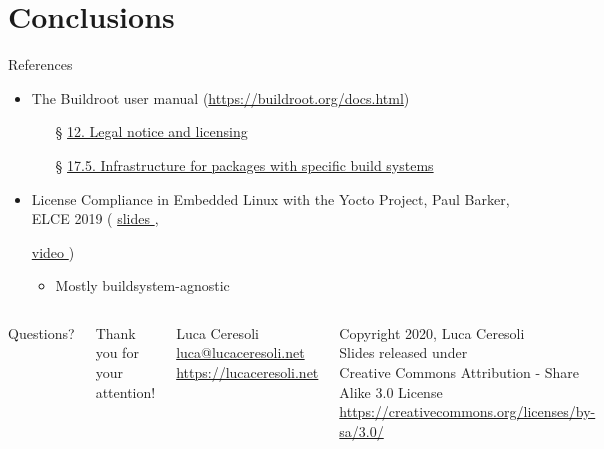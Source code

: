 \documentclass[xetex,table,table]{beamer}
\newcommand{\myhref}[2]{
  \href{#1}{#2 {\tiny\faExternalLink{}}}
}
\begin{document}
\section{Conclusions}

\begin{frame}{References}
  \begin{itemize}
  \item The Buildroot user manual ({\small\url{https://buildroot.org/docs.html}})
    \begin{itemize}
    \item[\S] \myhref{https://buildroot.org/downloads/manual/manual.html\#legal-info}
                     {12. Legal notice and licensing}
    \item[\S] \myhref{https://buildroot.org/downloads/manual/manual.html\#_infrastructure_for_packages_with_specific_build_systems}
                     {17.5. Infrastructure for packages with specific build systems}
    \end{itemize}
  \item License Compliance in Embedded Linux with the Yocto Project, Paul
    Barker, ELCE 2019
    (\myhref{https://elinux.org/images/2/20/License_Compliance_in_Embedded_Linux_with_the_Yocto_Project.pdf}{slides},
    \myhref{https://youtu.be/9wRn-9KhiEI?list=PLbzoR-pLrL6pamOj4UifcMJf560Ph6mJp}{video})
    \begin{itemize}
    \item Mostly buildsystem-agnostic
    \end{itemize}
  \end{itemize}
\end{frame}

\begin{frame}
  \begin{columns}
    \center

    {\Huge Questions?}

    \center

    {\Large Thank you for your attention!}

    \vspace{0.15\textheight}

    {\Large Luca Ceresoli}\\
    \href{mailto:luca@lucaceresoli.net}{luca@lucaceresoli.net}\\
    \url{https://lucaceresoli.net}

    \vspace{0.05\textheight}

    \tiny
    \textcopyright{} Copyright 2020, Luca Ceresoli\\
    Slides released under\\
    Creative Commons Attribution - Share Alike 3.0 License \\
    \url{https://creativecommons.org/licenses/by-sa/3.0/} \\
\end{columns}
\end{frame}
\end{document}
